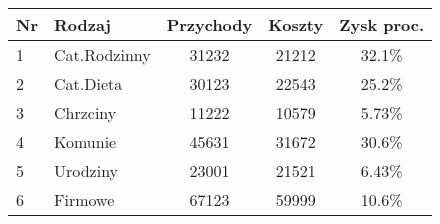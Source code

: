 \documentclass[10pt]{article}
\begin{document}
\begin{center}
    \begin{tabular}{l|l|c|c|c}
    \textbf{Nr} & \textbf{Rodzaj} & \textbf{Przychody} & \textbf{Koszty} & \textbf{Zysk proc.} \\
    \hline
    1 & Cat.Rodzinny & 31232 & 21212 & 32.1\% \\
    2 & Cat.Dieta    & 30123 & 22543 & 25.2\% \\
    3 & Chrzciny     & 11222 & 10579 & 5.73\% \\
    4 & Komunie      & 45631 & 31672 & 30.6\% \\
    5 & Urodziny     & 23001 & 21521 & 6.43\% \\
    6 & Firmowe      & 67123 & 59999 & 10.6\% \\
    \end{tabular}
\end{center}
\end{document}
